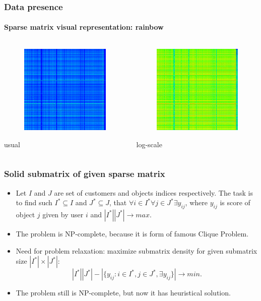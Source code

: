 \documentclass{beamer}
\begin{document}
\begin{frame}
\frametitle{Data presence}
\framesubtitle{Sparse matrix visual representation: rainbow}
\begin{columns}[T] %
\begin{column}{.48\textwidth}
\begin{figure}[h] 
    \includegraphics[width=5cm]{usual_0.png}
\end{figure}
usual
\end{column}%
\hfill%
\begin{column}{.48\textwidth}
\begin{figure}[h] 
    \includegraphics[width=5cm]{log_0.png}
\end{figure}
log-scale
\end{column}%
\end{columns}
\end{frame}

\begin{frame}
\frametitle{Solid submatrix of given sparse matrix}
\begin{itemize}
  \item Let $I$ and $J$ are set of customers and objects indices respectively.
The task is to find such $I^* \subseteq I$ and $J^* \subseteq J$, that 
$\forall i \in I^* \forall j \in J^*  \exists  y_{ij}$, where $y_{ij}$ is
score of object $j$ given by user $i$ and $|I^*||J^*| \rightarrow max$.
\item The problem is NP-complete, because it is form of famous Clique Problem.
\item Need for problem relaxation: maximize submatrix density for given
submatrix size $|I^*|\times |J^*|$: 
\begin{equation*}
|I^*||J^*| - |\{y_{ij}: i \in I^*, j \in J^*, \exists y_{ij} \}|
\rightarrow min.
\end{equation*}
\item The problem still is NP-complete, but now it has heuristical solution.
\end{itemize}
\end{frame}
\end{document}
